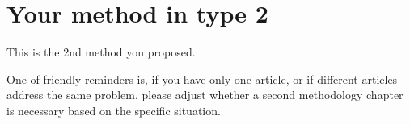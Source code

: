 \chapter{Your method in type 2} 
\label{Chapter4}

This is the 2nd method you proposed. 

One of friendly reminders is, if you have only one article, or if different articles address the same problem, please adjust whether a second methodology chapter is necessary based on the specific situation.